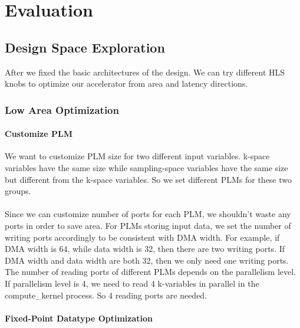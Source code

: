 \section{Evaluation}

\subsection{Design Space Exploration}
\label{dse}
After we fixed the basic architectures of the design. We can try different HLS
knobs to optimize our accelerator from area and latency directions. \\

\subsubsection{Low Area Optimization}

\paragraph{Customize PLM}

We want to customize PLM size for two different input variables. k-space
variables have the same size while sampling-space variables have the same size
but different from the k-space variables. So we set different PLMs for these two
groups. \\ \\ Since we can customize number of ports for each PLM, we shouldn't
waste any ports in order to save area. For PLMs storing input data, we set the
number of writing ports accordingly to be consistent with DMA width. For
example, if DMA width is 64, while data width is 32, then there are two writing
ports. If DMA width and data width are both 32, then we only need one writing
ports. The number of reading ports of different PLMs depends on the parallelism
level. If parallelism level is 4, we need to read 4 k-variables in parallel in
the compute\_kernel process. So 4 reading ports are needed.\\

\paragraph{Fixed-Point Datatype Optimization}

